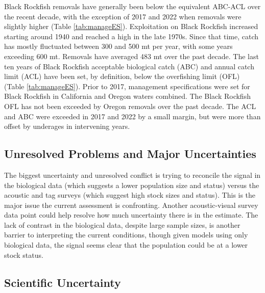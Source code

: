 \documentclass[11pt,
  english,
  letterpaper,
]{article}
\begin{document}
Black Rockfish removals have generally been below the equivalent ABC-ACL over the recent decade, with the exception of 2017 and 2022 when removals were slightly higher (Table \ref{tab:manageES}). Exploitation on Black Rockfish increased starting around 1940 and reached a high in the late 1970s. Since that time, catch has mostly fluctuated between 300 and 500 mt per year, with some years exceeding 600 mt. Removals have averaged 483 mt over the past decade. The last ten years of Black Rockfish acceptable biological catch (ABC) and annual catch limit (ACL) have been set, by definition, below the overfishing limit (OFL) (Table \ref{tab:manageES}). Prior to 2017, management specifications were set for Black Rockfish in California and Oregon waters combined. The Black Rockfish OFL has not been exceeded by Oregon removals over the past decade. The ACL and ABC were exceeded in 2017 and 2022 by a small margin, but were more than offset by underages in intervening years.



\hypertarget{unresolved-problems-and-major-uncertainties}{%
\subsection*{Unresolved Problems and Major Uncertainties}\label{unresolved-problems-and-major-uncertainties}}

The biggest uncertainty and unresolved conflict is trying to reconcile the signal in the biological data (which suggests a lower population size and status) versus the acoustic and tag surveys (which suggest high stock sizes and status). This is the major issue the current assessment is confronting. Another acoustic-visual survey data point could help resolve how much uncertainty there is in the estimate. The lack of contrast in the biological data, despite large sample sizes, is another barrier to interpreting the current conditions, though given models using only biological data, the signal seems clear that the population could be at a lower stock status.

\hypertarget{scientific-uncertainty}{%
\subsection*{Scientific Uncertainty}\label{scientific-uncertainty}}
\end{document}
